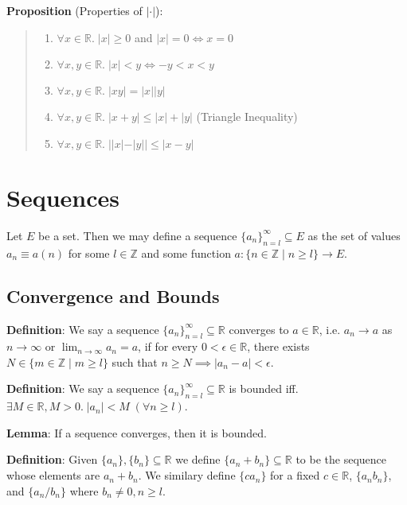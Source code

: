 \documentclass[11pt]{article}
\begin{document}
\textbf{Proposition} (Properties of $|\cdot|$):
\begin{quote}
	\begin{enumerate}
	\item $\forall x \in \mathbb{R}.\; |x| \geq 0$ and $|x| = 0 \iff x = 0$
	\item $\forall x,y \in \mathbb{R}.\; |x| < y \iff -y < x < y$
	\item $\forall x,y \in \mathbb{R}.\; |xy| = |x||y|$
	\item $\forall x,y \in \mathbb{R}.\; |x+y| \leq |x| + |y|$ (Triangle Inequality)
	\item $\forall x,y \in \mathbb{R}.\; ||x|-|y|| \leq |x-y|$
	\end{enumerate}
\end{quote}

\section{Sequences}

Let $E$ be a set. Then we may define a sequence $\{a_n\}_{n=l}^\infty \subseteq E$ as the set of values $a_n \equiv a(n)$ for some $l \in \mathbb{Z}$ and some function $a : \{n \in \mathbb{Z} \;|\; n \geq l\} \to E$.

\subsection{Convergence and Bounds}

\textbf{Definition}: We say a sequence $\{a_n\}_{n=l}^{\infty} \subseteq \mathbb{R}$ converges to $a \in \mathbb{R}$, i.e. $a_n \to a$ as $n \to \infty$ or $\lim_{n \to \infty} a_n = a$, if for every $0 < \epsilon \in \mathbb{R}$, there exists $N \in \{m \in \mathbb{Z} \;|\; m \geq l\}$ such that $n \geq N \implies |a_n - a| < \epsilon$.

\textbf{Definition}: We say a sequence $\{a_n\}_{n=l}^{\infty} \subseteq \mathbb{R}$ is bounded iff. $\exists M \in \mathbb{R}, M > 0.\; |a_n| < M \;(\forall n \geq l)$.

\textbf{Lemma}: If a sequence converges, then it is bounded.

\textbf{Definition}: Given $\{a_n\}, \{b_n\} \subseteq \mathbb{R}$ we define $\{a_n + b_n\} \subseteq \mathbb{R}$ to be the sequence whose elements are $a_n + b_n$. We similary define $\{ca_n\}$ for a fixed $c \in \mathbb{R}$, $\{a_nb_n\}$, and $\{a_n/b_n\}$ where $b_n \neq 0, n \geq l$.
\end{document}
